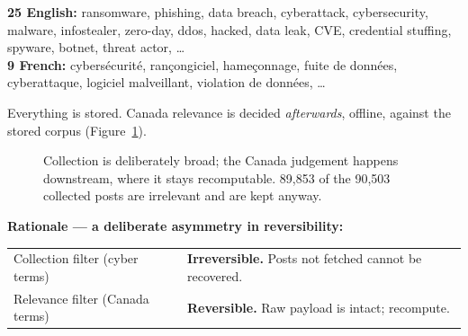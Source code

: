 \documentclass[11pt]{article}
\begin{document}
\begin{plainbox}
\small
\textbf{25 English:} ransomware, phishing, data breach, cyberattack,
cybersecurity, malware, infostealer, zero-day, ddos, hacked, data leak, CVE,
credential stuffing, spyware, botnet, threat actor, \ldots\\[0.4em]
\textbf{9 French:} cybersécurité, rançongiciel, hameçonnage, fuite de données,
cyberattaque, logiciel malveillant, violation de données, \ldots
\end{plainbox}

Everything is stored. Canada relevance is decided \emph{afterwards}, offline,
against the stored corpus (Figure~\ref{fig:funnel}).

\begin{figure}[htbp]
\centering
{}
\caption{Collection is deliberately broad; the Canada judgement happens downstream,
where it stays recomputable. 89{,}853 of the 90{,}503 collected posts are irrelevant
and are kept anyway.}
\label{fig:funnel}
\end{figure}

\textbf{Rationale --- a deliberate asymmetry in reversibility:}

\noindent
\begin{tabularx}{\textwidth}{@{}>{\raggedright\arraybackslash}p{} L@{}}
\toprule
 &  \\
\midrule
Collection filter (cyber terms) & \textcolor{warn}{\textbf{Irreversible.}} Posts not fetched cannot be recovered. \\
Relevance filter (Canada terms) & \textcolor{good}{\textbf{Reversible.}} Raw payload is intact; recompute. \\
\bottomrule
\end{tabularx}
\end{document}
